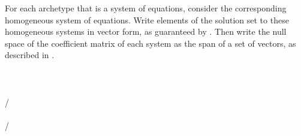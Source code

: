For each archetype that is a system of equations, consider the corresponding homogeneous system of equations.  Write elements of the solution set to these homogeneous systems in vector form, as guaranteed by .  Then  write the null space of the coefficient matrix of each system as the span of a set of vectors, as described in .\\
\\ 
\\ 
\\ 
/ 
\\ 
\\ 
/
\\ 
\\

